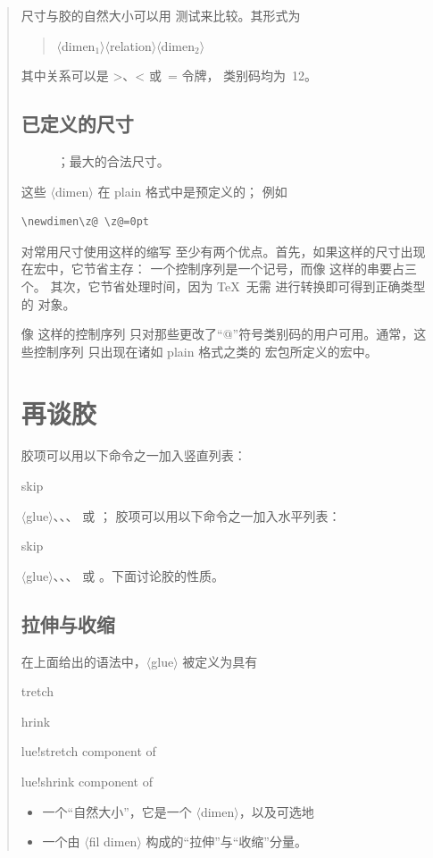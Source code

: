 \documentclass[a4paper]{rapport3}
\makeatletter
\def\gr#1{$\langle$#1$\rangle$}\def\key#1{{\tt#1}}
\def\alt{}\def\altt{}%
\newenvironment{disp}{\begin{quotation}}{\end{quotation}}
\newenvironment{inventory}{\begin{description}}{\end{description}}
\def\term#1\par{\index{#1}}
\def\cstoidx#1\par{\index{#1@\cs{#1}}}
\def\csidx#1{\cstoidx #1\par\cs{#1}}
\makeatother
\begin{document}
\begin{disp}
尺寸与胶的自然大小可以用  测试来比较。其形式为
\begin{disp}\gr{dimen$_1$}\gr{relation}\gr{dimen$_2$}\end{disp}
其中关系可以是 \n>、\n< 或~\n= 令牌，
类别码均为~12。

\subsection{已定义的尺寸}

\begin{inventory}
\item []
 \n{0pt}

\item [] 
      \n{16383.99999pt}；最大的合法尺寸。
\end{inventory}

这些 \gr{dimen} 在 plain 格式中是预定义的；
例如
\begin{verbatim}
\newdimen\z@ \z@=0pt
\end{verbatim}
对常用尺寸使用这样的缩写
至少有两个优点。首先，如果这样的尺寸出现在宏中，它节省主存：
一个控制序列是一个记号，而像 \n{0pt} 这样的串要占三个。
其次，它节省处理时间，因为 \TeX\ 无需
进行转换即可得到正确类型的
对象。

像  这样的控制序列
只对那些更改了“@”符号类别码的用户可用。通常，这些控制序列
只出现在诸如 plain 格式之类的
宏包所定义的宏中。

\section{再谈胶}

胶项可以用以下命令之一加入竖直列表：
\alt
\csidx{vskip}\gr{glue}、、、 或
；
胶项可以用以下命令之一加入水平列表：
\csidx{hskip}\gr{glue}、、、 或
。下面讨论胶的性质。

\subsection{拉伸与收缩}

在上面给出的语法中，\gr{glue} 被定义为具有
\term stretch\par\term shrink\par
\term glue!stretch component of\par\term glue!shrink component of\par
\begin{itemize}\item 一个“自然大小”，它是一个 \gr{dimen}，以及可选地
\item 一个由 \gr{fil dimen} 构成的“拉伸”与“收缩”分量。
\end{itemize}


\end{disp}
\end{document}
